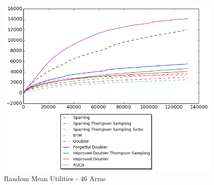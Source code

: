 \documentclass[MSc,beforeExam]{iitcsthesis}
\begin{document}
\newpage
\begin{figure}[h!]
\centering
  \includegraphics[scale=0.8]{graphs/random_data_46.png}
  \caption{Random Mean Utilities - 46 Arms}
\end{figure}
\newpage
\end{document}
